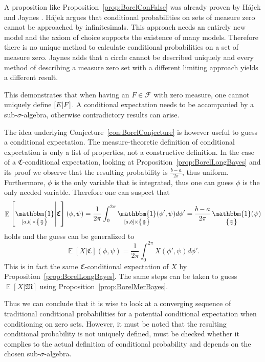 \documentclass[a4paper]{report}
\theoremstyle{plain}
\theoremstyle{definition}
\theoremstyle{remark}
\numberwithin{equation}{chapter}
\let\P\relax
\DeclareMathOperator{\P}{\mathbb{P}}
\DeclareMathOperator{\E}{\mathbb{E}}
\DeclareMathOperator{\1}{\mathbbm{1}}
\newcommand{\F}{\mathcal{F}}
\begin{document}
A proposition like Proposition~\ref{prop:BorelConFalse} was already proven by Hájek \cite{Hajek03} and Jaynes \cite{Jaynes03}. Hájek argues that conditional probabilities on sets of measure zero cannot be approached by infinitesimals. This approach needs an entirely new model and the axiom of choice supports the existence of many models. Therefore there is no unique method to calculate conditional probabilities on a set of measure zero. Jaynes adds that a circle cannot be described uniquely and every method of describing a measure zero set with a different limiting approach yields a different result.

This demonstrates that when having an $F\in\F$ with zero measure, one cannot uniquely define $\P[E|F]$. A conditional expectation needs to be accompanied by a sub-$\sigma$-algebra, otherwise contradictory results can arise.

The idea underlying Conjecture~\ref{con:BorelConjecture} is however useful to guess a conditional expectation. The measure-theoretic definition of conditional expectation is only a list of properties, not a constructive definition. In the case of a $\mathfrak{C}$-conditional expectation, looking at Proposition~\ref{prop:BorelLongBayes} and its proof we observe that the resulting probability is $\frac{b-a}{2\pi}$, thus uniform. Furthermore, $\phi$ is the only variable that is integrated, thus one can guess $\phi$ is the only needed variable. Therefore one can suspect that
\begin{equation}
\E\left[\1_{[a,b]\times\left\{\frac{\pi}{2}\right\}}\middle|\mathfrak{C}\right](\phi,\psi)=\frac{1}{2\pi}\int_0^{2\pi}\1_{[a,b]\times\left\{\frac{\pi}{2}\right\}}(\phi',\psi)d\phi'=\frac{b-a}{2\pi}\1_{\left\{\frac{\pi}{2}\right\}}(\psi)
\end{equation}
holds and the guess can be generalized to
\begin{equation}
\E[X|\mathfrak{C}](\phi,\psi)=\frac{1}{2\pi}\int_0^{2\pi}X(\phi',\psi)d\phi'.
\end{equation}
This is in fact the same $\mathfrak{C}$-conditional expectation of $X$ by Proposition~\ref{prop:BorelLongBayes}. The same steps can be taken to guess $\E[X|\mathfrak{M}]$ using Proposition~\ref{prop:BorelMerBayes}.

Thus we can conclude that it is wise to look at a converging sequence of traditional conditional probabilities for a potential conditional expectation when conditioning on zero sets. However, it must be noted that the resulting conditional probability is not uniquely defined, must be checked whether it complies to the actual definition of conditional probability and depends on the chosen sub-$\sigma$-algebra.
\end{document}
